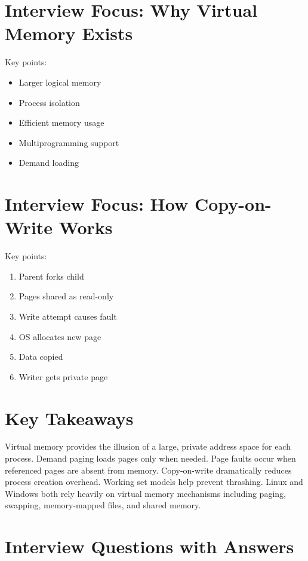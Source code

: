 \section{Interview Focus: Why Virtual Memory Exists}

Key points:

\begin{itemize}
\item Larger logical memory
\item Process isolation
\item Efficient memory usage
\item Multiprogramming support
\item Demand loading
\end{itemize}

\section{Interview Focus: How Copy-on-Write Works}

Key points:

\begin{enumerate}
\item Parent forks child
\item Pages shared as read-only
\item Write attempt causes fault
\item OS allocates new page
\item Data copied
\item Writer gets private page
\end{enumerate}

\section{Key Takeaways}

\begin{keytakeaways}
Virtual memory provides the illusion of a large, private address space for each process. Demand paging loads pages only when needed. Page faults occur when referenced pages are absent from memory. Copy-on-write dramatically reduces process creation overhead. Working set models help prevent thrashing. Linux and Windows both rely heavily on virtual memory mechanisms including paging, swapping, memory-mapped files, and shared memory.
\end{keytakeaways}

\section{Interview Questions with Answers}

